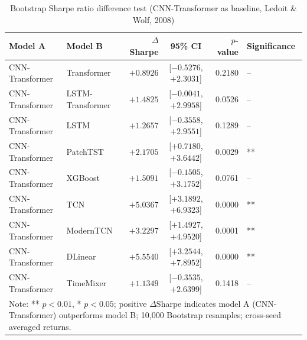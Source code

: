 \begin{table}[t]
\centering
\caption{Bootstrap Sharpe ratio difference test (CNN-Transformer as baseline, Ledoit \& Wolf, 2008)}
\label{tab:bootstrap_sharpe}
\footnotesize
\setlength{\tabcolsep}{4pt}
\begin{tabular}{llrcrl}
\toprule
Model A & Model B & $\Delta$Sharpe & 95\% CI & $p$-value & Significance \\
\midrule
CNN-Transformer & Transformer & $+0.8926$ & [$-0.5276$, $+2.3031$] & 0.2180 & -- \\
CNN-Transformer & LSTM-Transformer & $+1.4825$ & [$-0.0041$, $+2.9958$] & 0.0526 & -- \\
CNN-Transformer & LSTM & $+1.2657$ & [$-0.3558$, $+2.9551$] & 0.1289 & -- \\
CNN-Transformer & PatchTST & $+2.1705$ & [$+0.7180$, $+3.6442$] & 0.0029 & ** \\
CNN-Transformer & XGBoost & $+1.5091$ & [$-0.1505$, $+3.1752$] & 0.0761 & -- \\
CNN-Transformer & TCN & $+5.0367$ & [$+3.1892$, $+6.9323$] & 0.0000 & ** \\
CNN-Transformer & ModernTCN & $+3.2297$ & [$+1.4927$, $+4.9520$] & 0.0001 & ** \\
CNN-Transformer & DLinear & $+5.5540$ & [$+3.2544$, $+7.8952$] & 0.0000 & ** \\
CNN-Transformer & TimeMixer & $+1.1349$ & [$-0.3535$, $+2.6399$] & 0.1418 & -- \\
\bottomrule
\multicolumn{6}{p{0.85\textwidth}}{\footnotesize Note: ** $p<0.01$, * $p<0.05$; positive $\Delta$Sharpe indicates model A (CNN-Transformer) outperforms model B; 10,000 Bootstrap resamples; cross-seed averaged returns.} \\
\end{tabular}
\end{table}
